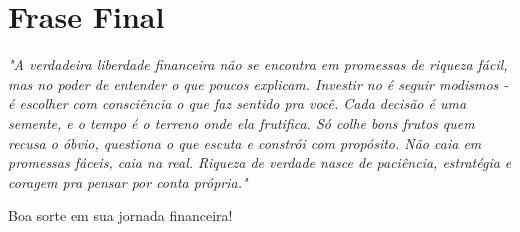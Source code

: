 \section{Frase Final}

\noindent \textit{"A verdadeira liberdade financeira não se encontra em promessas de riqueza fácil, mas no poder de entender o que poucos explicam. Investir no é seguir modismos - é escolher com consciência o que faz sentido pra você. Cada decisão é uma semente, e o tempo é o terreno onde ela frutifica. Só colhe bons frutos quem recusa o óbvio, questiona o que escuta e constrói com propósito. Não caia em promessas fáceis, caia na real. Riqueza de verdade nasce de paciência, estratégia e coragem pra pensar por conta própria."}

\noindent Boa sorte em sua jornada financeira!